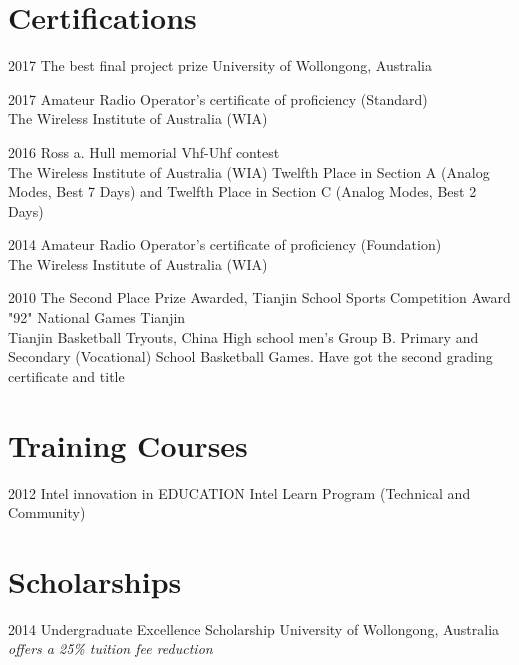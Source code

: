 \documentclass[]{friggeri-cv}
\begin{document}
\section{Certifications}
\begin{entrylist}
  \entry
    {2017}
    {The best final project prize}
    {University of Wollongong, Australia}

  \entry
    {2017}
    {Amateur Radio Operator's certificate of proficiency (Standard)\\}
    {The Wireless Institute of Australia (WIA)}

  \entry
    {2016}
    {Ross a. Hull memorial Vhf-Uhf contest\\}
    {The Wireless Institute of Australia (WIA)}
    {Twelfth Place in Section A (Analog Modes, Best
7 Days) and Twelfth Place in Section C (Analog Modes, Best 2 Days)}

  \entry
    {2014}
    {Amateur Radio Operator's certificate of proficiency (Foundation)\\}
    {The Wireless Institute of Australia (WIA)}
   
  \entry
    {2010}
    {The Second Place Prize Awarded, Tianjin School Sports Competition Award "92" National Games Tianjin\\}
    {Tianjin Basketball Tryouts, China}
    {High school men's Group B. Primary and Secondary (Vocational) School Basketball Games. Have got the second grading certificate and title}

\end{entrylist}

\section{Training Courses}
\begin{entrylist}
  \entry
    {2012}
    {Intel innovation in EDUCATION}
    {Intel Learn Program (Technical and Community)}

\end{entrylist}

\section{Scholarships}
\begin{entrylist}
  \entry
    {2014}
    {Undergraduate Excellence Scholarship}
    {University of Wollongong, Australia}
    {\emph{offers a 25\% tuition fee reduction}}
\end{entrylist}
\end{document}
